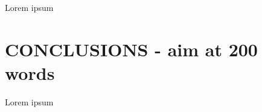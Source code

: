 \documentclass[letterpaper, 10 pt, conference]{ieeeconf}  %
\begin{document}
Lorem ipsum

\section{CONCLUSIONS - aim at 200 words}

Lorem ipsum\cite{gunasekaran2011evaluation}

\addtolength{\textheight}{-12cm}   %










\end{document}
